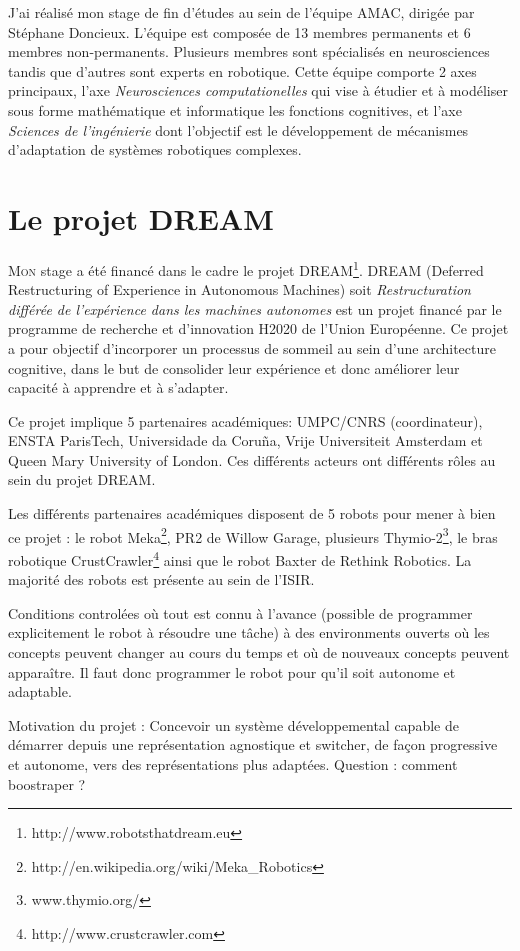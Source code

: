 \documentclass{llncs}
\begin{document}
J'ai réalisé mon stage de fin d'études au sein de l'équipe AMAC, dirigée par Stéphane Doncieux. L'équipe est composée de 13 membres permanents et 6 membres non-permanents. Plusieurs membres sont spécialisés en neurosciences tandis que d'autres sont experts en robotique. Cette équipe comporte 2 axes principaux, l'axe \textit{Neurosciences computationelles} qui vise à étudier et à modéliser sous forme mathématique et informatique les fonctions cognitives, et l'axe \textit{Sciences de l'ingénierie} dont l'objectif est le développement de mécanismes d'adaptation de systèmes robotiques complexes.




\section{Le projet DREAM}

\lettrine{M}{on} stage a été financé dans le cadre le projet DREAM\footnote{http://www.robotsthatdream.eu}. DREAM (Deferred Restructuring of Experience in Autonomous Machines) soit \textit{Restructuration différée de l'expérience dans les machines autonomes} est un projet financé par le programme de recherche et d'innovation H2020 de l'Union Européenne. Ce projet a pour objectif d'incorporer un processus de sommeil au sein d'une architecture cognitive, dans le but de consolider leur expérience et donc améliorer leur capacité à apprendre et à s'adapter.

Ce projet implique 5 partenaires académiques: UMPC/CNRS (coordinateur), ENSTA ParisTech, Universidade da Coruña, Vrije Universiteit Amsterdam et Queen Mary University of London. Ces différents acteurs ont différents rôles au sein du projet DREAM.

Les différents partenaires académiques disposent de 5 robots pour mener à bien ce projet : le robot Meka\footnote{http://en.wikipedia.org/wiki/Meka\_Robotics}, PR2 de Willow Garage, plusieurs Thymio-2\footnote{www.thymio.org/}, le bras robotique CrustCrawler\footnote{http://www.crustcrawler.com} ainsi que le robot Baxter de Rethink Robotics. La majorité des robots est présente au sein de l'ISIR.

Conditions controlées où tout est connu à l'avance (possible de programmer explicitement le robot à résoudre une tâche) à des environments ouverts où les concepts peuvent changer au cours du temps et où de nouveaux concepts peuvent apparaître. Il faut donc programmer le robot pour qu'il soit autonome et adaptable.

Motivation du projet : Concevoir un système développemental capable de démarrer depuis une représentation agnostique et switcher, de façon progressive et autonome, vers des représentations plus adaptées. Question : comment boostraper ?
\end{document}
